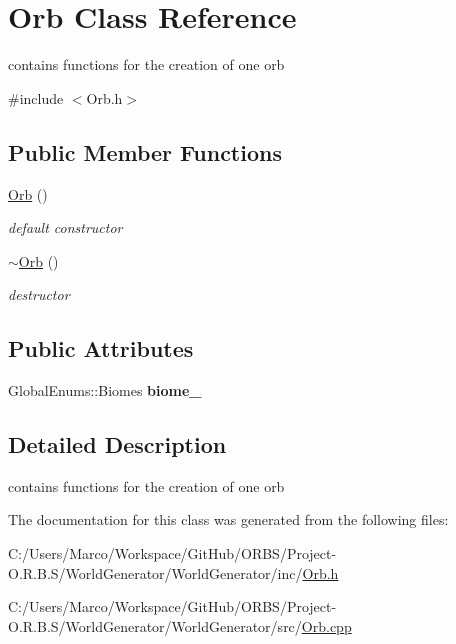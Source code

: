 \hypertarget{class_orb}{\section{Orb Class Reference}
\label{class_orb}
}


contains functions for the creation of one orb  




{\ttfamily \#include $<$Orb.\-h$>$}

\subsection*{Public Member Functions}
\begin{DoxyCompactItemize}
\item 
\hypertarget{class_orb_a2e91e4fe9a5aeab6e4dbc9e0e2a59aa6}{\hyperlink{class_orb_a2e91e4fe9a5aeab6e4dbc9e0e2a59aa6}{Orb} ()}\label{class_orb_a2e91e4fe9a5aeab6e4dbc9e0e2a59aa6}

\begin{DoxyCompactList}\small\item\em default constructor \end{DoxyCompactList}\item 
\hypertarget{class_orb_ad734050302977086e04c5b66ab38f2cb}{\hyperlink{class_orb_ad734050302977086e04c5b66ab38f2cb}{$\sim$\-Orb} ()}\label{class_orb_ad734050302977086e04c5b66ab38f2cb}

\begin{DoxyCompactList}\small\item\em destructor \end{DoxyCompactList}\end{DoxyCompactItemize}
\subsection*{Public Attributes}
\begin{DoxyCompactItemize}
\item 
\hypertarget{class_orb_aaad7546acb9730576d9c253a7f614270}{Global\-Enums\-::\-Biomes {\bfseries biome\-\_\-}}\label{class_orb_aaad7546acb9730576d9c253a7f614270}

\end{DoxyCompactItemize}


\subsection{Detailed Description}
contains functions for the creation of one orb 

The documentation for this class was generated from the following files\-:\begin{DoxyCompactItemize}
\item 
C\-:/\-Users/\-Marco/\-Workspace/\-Git\-Hub/\-O\-R\-B\-S/\-Project-\/\-O.\-R.\-B.\-S/\-World\-Generator/\-World\-Generator/inc/\hyperlink{_orb_8h}{Orb.\-h}\item 
C\-:/\-Users/\-Marco/\-Workspace/\-Git\-Hub/\-O\-R\-B\-S/\-Project-\/\-O.\-R.\-B.\-S/\-World\-Generator/\-World\-Generator/src/\hyperlink{_orb_8cpp}{Orb.\-cpp}\end{DoxyCompactItemize}
